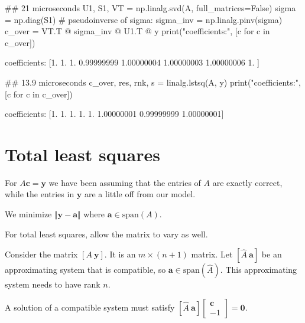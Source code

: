 \documentclass[12pt,letterpaper,noanswers]{exam}
\begin{document}
\begin{pyin}
\## 21 microseconds
U1, S1, VT = np.linalg.svd(A, full_matrices=False)
sigma = np.diag(S1)
# pseudoinverse of sigma:
sigma_inv = np.linalg.pinv(sigma)
c_over = VT.T @ sigma_inv @ U1.T @ y
print("coefficients:", [c for c in c_over])
\end{pyin}
\begin{pyout}
coefficients: [1.         1.         1.         0.99999999 1.00000004 1.00000003 1.00000006 1.        ]
\end{pyout}

\begin{pyin}
\## 13.9 microseconds
c_over, res, rnk, s = linalg.lstsq(A, y)
print("coefficients:", [c for c in c_over])
\end{pyin}
\begin{pyout}
coefficients: [1.         1.         1.         1.         1.         1.00000001 0.99999999 1.00000001]
\end{pyout}







\section{Total least squares}

For $A\mathbf{c}= \mathbf{y}$ we have been assuming that the entries of $A$ are exactly correct, while the entries in $\mathbf{y}$ are a little off from our model.

We minimize $\Vert \mathbf{y} - \mathbf{a}\Vert$ where $\mathbf{a}\in\text{span}(A)$.  

For total least squares, allow the matrix to vary as well.

Consider the matrix $[A\ \mathbf{y}]$.  It is an $m \times (n+1)$ matrix.  Let $[\hat{A}\ \mathbf{a}]$ be an approximating system that is compatible, so $\mathbf{a}\in\text{span}(\hat{A})$.  This approximating system needs to have rank $n$.

A solution of a compatible system must satisfy $[\hat{A} \ \mathbf{a}]\left[\begin{array}{r} \mathbf{c} \\ -1 \end{array}\right] = \mathbf{0}$.
\end{document}
